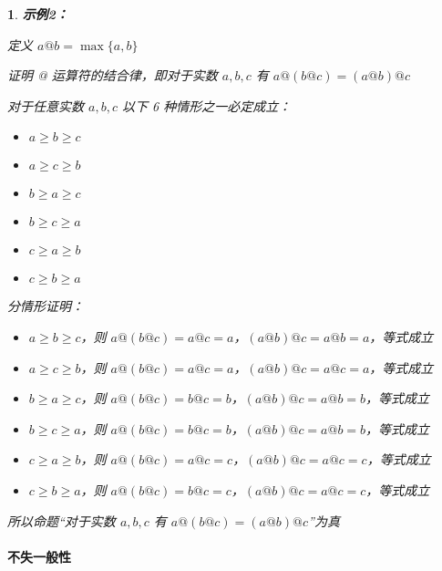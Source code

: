 \documentclass[UTF8]{report}
\theoremstyle{MyLineTheoremStyle} %
\theoremstyle{MyBlockTheoremStyle} %
\theoremstyle{MySubsubsectionStyle} %
\newtheorem{definition}{}
\begin{document}
\begin{definition}
    \textbf{示例2：}\par
    定义 $a@b = \max\{a, b\}$\par
    证明 @ 运算符的结合律，即对于实数 $a, b, c$ 有 $a@(b@c) = (a@b)@c$\par
    对于任意实数 $a, b, c$ 以下 6 种情形之一必定成立：\par
    \begin{itemize}
        \item $a \geq b \geq c$
        \item $a \geq c \geq b$
        \item $b \geq a \geq c$
        \item $b \geq c \geq a$
        \item $c \geq a \geq b$
        \item $c \geq b \geq a$
    \end{itemize}

    分情形证明：\par
    \begin{itemize}
        \item $a \geq b \geq c$，则 $a@(b@c) = a@c = a$，$(a@b)@c = a@b = a$，等式成立
        \item $a \geq c \geq b$，则 $a@(b@c) = a@c = a$，$(a@b)@c = a@c = a$，等式成立
        \item $b \geq a \geq c$，则 $a@(b@c) = b@c = b$，$(a@b)@c = a@b = b$，等式成立
        \item $b \geq c \geq a$，则 $a@(b@c) = b@c = b$，$(a@b)@c = a@b = b$，等式成立
        \item $c \geq a \geq b$，则 $a@(b@c) = a@c = c$，$(a@b)@c = a@c = c$，等式成立
        \item $c \geq b \geq a$，则 $a@(b@c) = b@c = c$，$(a@b)@c = a@c = c$，等式成立
    \end{itemize}
    所以命题“对于实数 $a, b, c$ 有 $a@(b@c) = (a@b)@c$”为真\par
\end{definition}

\paragraph{不失一般性}
\end{document}
